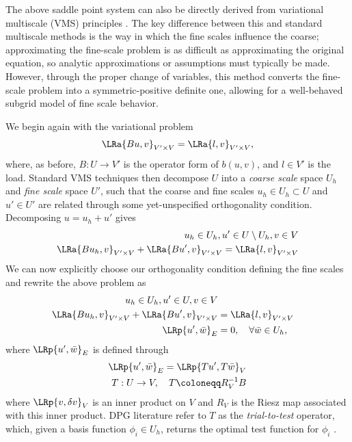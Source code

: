 The above saddle point system can also be directly derived from variational multiscale (VMS) principles \cite{VMS1,VMS2}.  The key difference between this and standard multiscale methods is the way in which the fine scales influence the coarse; approximating the fine-scale problem is as difficult as approximating the original equation, so analytic approximations or assumptions must typically be made.  However, through the proper change of variables, this method converts the fine-scale problem into a symmetric-positive definite one, allowing for a well-behaved subgrid model of fine scale behavior.

We begin again with the variational problem
\[
\LRa{Bu,v}_{V'\times V} = \LRa{l,v}_{V'\times V},
\]
where, as before, $B: U\rightarrow V'$ is the operator form of $b(u,v)$, and $l \in V'$ is the load.  Standard VMS techniques then decompose $U$ into a \textit{coarse scale} space $U_h$ and \textit{fine scale} space $U'$, such that the coarse and fine scales $u_h \in U_h \subset U$ and $u' \in U'$ are related through some yet-unspecified orthogonality condition.  Decomposing $u = u_h + u'$ gives 
\begin{align*}
u_h \in U_h, u' \in U\setminus U_h, v \in V\\
\LRa{Bu_h,v}_{V'\times V} + \LRa{Bu',v}_{V'\times V} = \LRa{l,v}_{V'\times V}
\end{align*}
We can now explicitly choose our orthogonality condition defining the fine scales and rewrite the above problem as 
\begin{align*}
u_h \in U_h, u' \in U, v \in V\\
\LRa{Bu_h,v}_{V'\times V} + \LRa{Bu',v}_{V'\times V} &= \LRa{l,v}_{V'\times V}\\
\LRp{u',\bar{w}}_E &= 0, \quad \forall \bar{w} \in U_h,
\end{align*}
where $\LRp{u',\bar{w}}_E$ is defined through
\begin{align*}
\LRp{u',\bar{w}}_E = \LRp{Tu',T\bar{w}}_V\\
T:U\rightarrow V, \quad T \coloneqq R_V^{-1} B
\end{align*}
where $\LRp{v,\delta v}_V$ is an inner product on $V$ and $R_V$ is the Riesz map associated with this inner product.  DPG literature refer to $T$ as the \textit{trial-to-test} operator, which, given a basis function $\phi_i \in U_h$, returns the optimal test function for $\phi_i$ \cite{DPG2}.  

